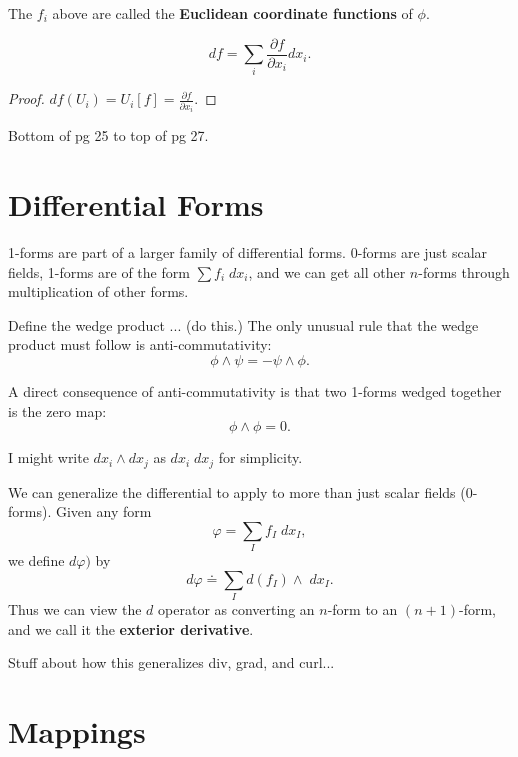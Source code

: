 \documentclass[10pt]{report}
\begin{document}
\begin{defn}
The $f_i$ above are called the \textbf{Euclidean coordinate functions} of $\phi$.
\end{defn}

\begin{cor}
	\[ df = \sum_i \frac{\partial f}{\partial x_i} dx_i.\]
\end{cor}
\begin{proof}
	$df(U_i) = U_i[f] = \frac{\partial f}{\partial x_i} .$
\end{proof}

{\color{red}Bottom of pg 25 to top of pg 27.}


\section{Differential Forms}

1-forms are part of a larger family of differential forms. 0-forms are just scalar fields, 1-forms are of the form $\sum f_i \;dx_i$, and we can get all other $n$-forms through multiplication of other forms.

Define the wedge product ... {\color{red}(do this.)} The only unusual rule that the wedge product must follow is anti-commutativity:
\[
\phi \wedge \psi = - \psi \wedge \phi.
\] 

\begin{ex}
A direct consequence of anti-commutativity is that two 1-forms wedged together is the zero map:
\[
\phi\wedge\phi = 0.
\] 
\end{ex}

\begin{note}
I might write $dx_i \wedge dx_j$ as $dx_i\;dx_j$ for simplicity.
\end{note}

We can generalize the differential to apply to more than just scalar fields (0-forms). Given any form
\[
\varphi = \sum_{I} f_I \;dx_I,
\] we define $d\varphi)$ by
\[
	d\varphi \doteq \sum_{I} d(f_I)\wedge \;dx_I.
\] 
Thus we can view the $d$ operator as converting an $n$-form to an $(n+1)$-form, and we call it the \textbf{exterior derivative}.

{\color{red}Stuff about how this generalizes div, grad, and curl...}


\section{Mappings}
\end{document}
